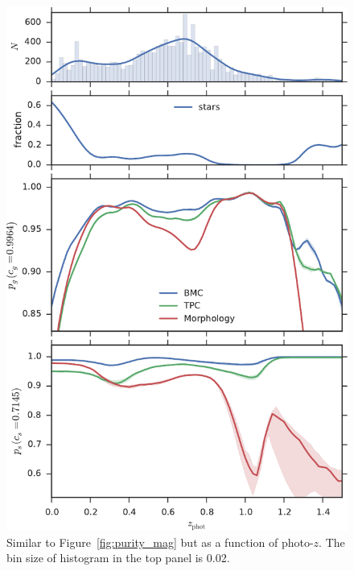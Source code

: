 \begin{figure}[htp]
  \centering
  \includegraphics[width=0.7\linewidth]{figures/purity_z.pdf}
  \caption{Similar to Figure~\ref{fig:purity_mag}
           but as a function of photo-$z$.
           The bin size of histogram in the top panel is 0.02.}
  \label{fig:purity_z}
\end{figure}

